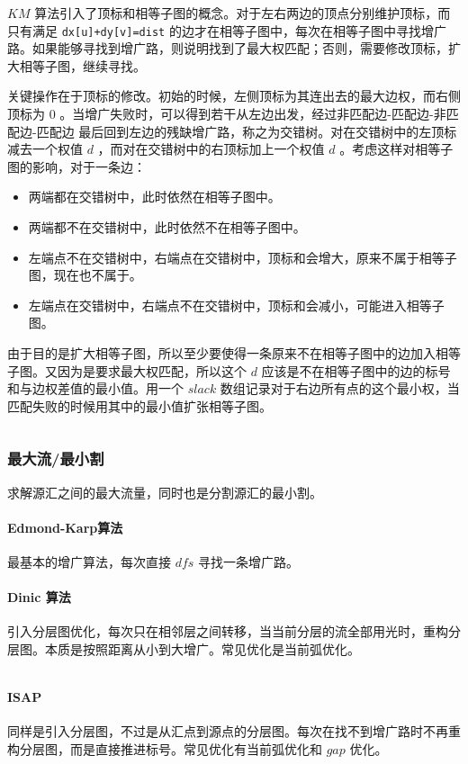\documentclass[UTF-8]{ctexart}
\newcommand{\cpp}[1]{\inputminted[bgcolor=bg,breaklines,breakanywhere=true]{c++}{#1}}
\begin{document}
			$KM$ 算法引入了顶标和相等子图的概念。对于左右两边的顶点分别维护顶标，而只有满足 \texttt{dx[u]+dy[v]=dist} 的边才在相等子图中，每次在相等子图中寻找增广路。如果能够寻找到增广路，则说明找到了最大权匹配；否则，需要修改顶标，扩大相等子图，继续寻找。
			
			关键操作在于顶标的修改。初始的时候，左侧顶标为其连出去的最大边权，而右侧顶标为 $0$ 。当增广失败时，可以得到若干从左边出发，经过非匹配边-匹配边-非匹配边-匹配边 最后回到左边的残缺增广路，称之为交错树。对在交错树中的左顶标减去一个权值 $d$ ，而对在交错树中的右顶标加上一个权值 $d$ 。考虑这样对相等子图的影响，对于一条边：
			\begin{itemize}
				\item 两端都在交错树中，此时依然在相等子图中。
				\item 两端都不在交错树中，此时依然不在相等子图中。
				\item 左端点不在交错树中，右端点在交错树中，顶标和会增大，原来不属于相等子图，现在也不属于。
				\item 左端点在交错树中，右端点不在交错树中，顶标和会减小，可能进入相等子图。
			\end{itemize}
		
			由于目的是扩大相等子图，所以至少要使得一条原来不在相等子图中的边加入相等子图。又因为是要求最大权匹配，所以这个 $d$ 应该是不在相等子图中的边的标号和与边权差值的最小值。用一个 $slack$ 数组记录对于右边所有点的这个最小权，当匹配失败的时候用其中的最小值扩张相等子图。
			\cpp{code//Graph//km.cpp}
			\subsubsection{最大流/最小割}
			求解源汇之间的最大流量，同时也是分割源汇的最小割。
			\paragraph{Edmond-Karp算法} 最基本的增广算法，每次直接 $dfs$ 寻找一条增广路。
			\paragraph{Dinic 算法} 引入分层图优化，每次只在相邻层之间转移，当当前分层的流全部用光时，重构分层图。本质是按照距离从小到大增广。常见优化是当前弧优化。
			\cpp{code//Graph//dinic.cpp}
			\paragraph{ISAP} 同样是引入分层图，不过是从汇点到源点的分层图。每次在找不到增广路时不再重构分层图，而是直接推进标号。常见优化有当前弧优化和 $gap$ 优化。
			\cpp{code//Graph//isap.cpp}
\end{document}
